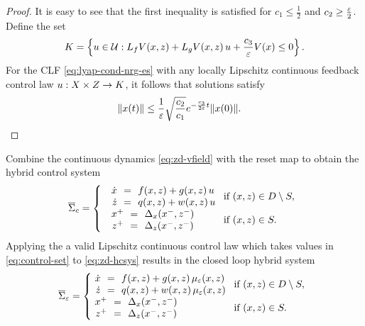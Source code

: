 \documentclass[twocolumn]{article}
\begin{document}
\begin{proof}
  It is easy to see that the first inequality is satisfied for $c_{1} \leq \frac{1}{2}$ and $c_{2} \geq \frac{\varepsilon}{2}$.
  Define the set
  \begin{align}
    K = \left\{ u \in \mathcal{U} : L_{f} V(x, z) + L_{g} V(x, z) \, u + \frac{c_{3}}{\varepsilon} V(x) \leq 0 \right\}.
    \label{eq:control-set}
  \end{align}
  For the CLF \eqref{eq:lyap-cond-nrg-es} with any locally Lipschitz continuous feedback control law $u : X \times Z \to K$, it follows that solutions satisfy
  \begin{align*}
    \| x(t) \| \leq \frac{1}{\varepsilon} \sqrt{\frac{c_{2}}{c_{1}}} e^{-\frac{c_{3}}{2\varepsilon} t} \| x(0) \|. & \qedhere
  \end{align*}
  
\end{proof}

Combine the continuous dynamics \eqref{eq:zd-vfield} with the reset map to obtain the hybrid control system
\begin{align}
  \label{eq:zd-hcsys}
  \HCSbar= \left\{
  \begin{array}{l l}
    \begin{array}{r c l}
      {\dot \zdx} &\!\!=\!\!& f(\zdx, \zdz) + g(\zdx, \zdz) \, u\\
      {\dot \zdz} &\!\!=\!\!& q(\zdx, \zdz) + w(\zdx, \zdz) \, u
    \end{array} \!\! & \!\! \mbox{if } (\zdx, \zdz) \in \D \setminus \S,\\
    \begin{array}{r c l}
      \zdx^{+} &\!\!=\!\!& \Delta_{\zdx}(\zdx^{-}, \zdz^{-})\\
      \zdz^{+} &\!\!=\!\!& \Delta_{\zdz}(\zdx^{-}, \zdz^{-})
    \end{array} \!\! & \!\! \mbox{if } (\zdx, \zdz) \in \S.
  \end{array}\right.
\end{align}
%
Applying the a valid Lipschitz continuous control law which takes values in \eqref{eq:control-set} to \eqref{eq:zd-hcsys} results in the closed loop hybrid system
%
\begin{align}
  \label{eq:zd-hsys-cl}
  \HSbar_{\resclfparam} = \left\{\!\!\!\!
  \begin{array}{l l}
    \begin{array}{r c l}
      {\dot \zdx} &\!\!=\!\!& f(\zdx, \zdz) + g(\zdx, \zdz) \, \mueps(\zdx, \zdz)\\
      {\dot \zdz} &\!\!=\!\!& q(\zdx, \zdz) + w(\zdx, \zdz) \, \mueps(\zdx, \zdz)
    \end{array} \!\! & \!\! \mbox{if } (\zdx, \zdz) \in \D \setminus \S,\\
    \begin{array}{r c l}
      \zdx^{+} &\!\!=\!\!& \Delta_{\zdx}(\zdx^{-}, \zdz^{-})\\
      \zdz^{+} &\!\!=\!\!& \Delta_{\zdz}(\zdx^{-}, \zdz^{-})
    \end{array} \!\! & \!\! \mbox{if } (\zdx, \zdz) \in \S.
  \end{array}\right.
\end{align}
\end{document}
